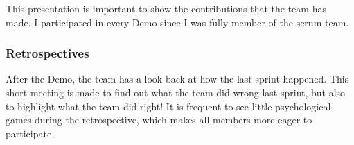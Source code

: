 This presentation is important to show the contributions that the team has made.
I participated in every Demo since I was fully member of the \gls{scrum} team.

\subsubsection{Retrospectives}
After the Demo, the team has a look back at how the last sprint happened. This short meeting is made
to find out what the team did wrong last sprint, but also to highlight what the team did right!
It is frequent to see little psychological games during the retrospective, which makes all members more
eager to participate.
